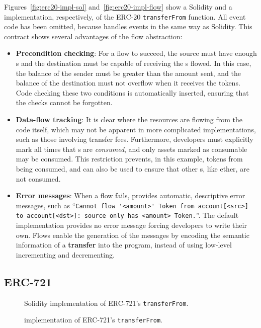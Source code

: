 \documentclass[dvipsnames, usenames, sigconf]{acmart}
\begin{document}
Figures~\ref{fig:erc20-impl-sol} and~\ref{fig:erc20-impl-flow} show a Solidity and a \langName implementation, respectively, of the ERC-20  \lstinline{transferFrom} function.
All event code has been omitted, because \langName handles events in the same way as Solidity.
This contract shows several advantages of the flow abstraction:
\begin{itemize}
    \item \textbf{Precondition checking}: For a flow to succeed, the source must have enough \assetTxt{}s and the destination must be capable of receiving the \assetTxt{}s flowed.
        In this case, the balance of the sender must be greater than the amount sent, and the balance of the destination must not overflow when it receives the tokens.
        Code checking these two conditions is automatically inserted, ensuring that the checks cannot be forgotten.
    \item \textbf{Data-flow tracking}: It is clear where the resources are flowing from the code itself, which may not be apparent in more complicated implementations, such as those involving transfer fees.
        Furthermore, developers must explicitly mark all times that \assetTxt{}s are \emph{consumed}, and only assets marked as consumable may be consumed.
        This restriction prevents, in this example, tokens from being consumed, and can also be used to ensure that other \assetTxt{}s, like ether, are not consumed.
    \item \textbf{Error messages}: When a flow fails, \langName provides  automatic, descriptive error messages, such as ``\lstinline{Cannot flow '<amount>' Token from account[<src>] to account[<dst>]: source only has <amount> Token.}''.
        The default implementation provides no error message forcing developers to write their own.
        Flows enable the generation of the messages by encoding the semantic information of a \textbf{transfer} into the program, instead of using low-level incrementing and decrementing.
\end{itemize}

\subsection{ERC-721}\label{sec:erc721-impl}
\begin{figure*}[h]
    \centering
    \begin{subfigure}[t]{0.5\textwidth}
        \centering
        
        \caption{Solidity implementation of ERC-721's \lstinline{transferFrom}.}
    \end{subfigure}%
    \begin{subfigure}[t]{0.5\textwidth}
        \centering
        
        \caption{\langName implementation of ERC-721's \lstinline{transferFrom}.}
    \end{subfigure}
    \label{fig:erc721-impl}
\end{figure*}
\end{document}
